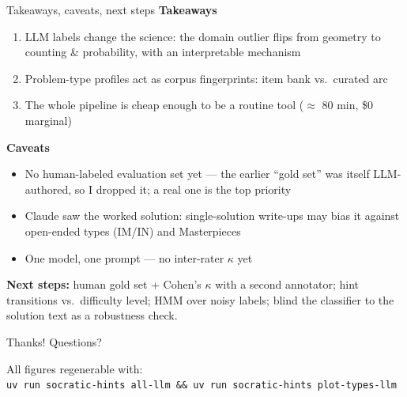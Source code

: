 \documentclass[10pt,aspectratio=169]{beamer}
\begin{document}
\begin{frame}{Takeaways, caveats, next steps}
  \textbf{Takeaways}
  \begin{enumerate}
    \item LLM labels change the science: the domain outlier flips from geometry to
          counting \& probability, with an interpretable mechanism
    \item Problem-type profiles act as corpus fingerprints: item bank vs.\ curated arc
    \item The whole pipeline is cheap enough to be a routine tool ($\approx$ 80 min, \$0 marginal)
  \end{enumerate}
  \medskip
  \textbf{Caveats}
  \begin{itemize}
    \item No human-labeled evaluation set yet --- the earlier ``gold set'' was itself
          LLM-authored, so I dropped it; a real one is the top priority
    \item Claude saw the worked solution: single-solution write-ups may bias it against
          open-ended types (IM/IN) and Masterpieces
    \item One model, one prompt --- no inter-rater $\kappa$ yet
  \end{itemize}
  \medskip
  \textbf{Next steps:} human gold set + Cohen's $\kappa$ with a second annotator;
  hint transitions vs.\ difficulty level; HMM over noisy labels; blind the classifier
  to the solution text as a robustness check.
\end{frame}

\begin{frame}
  \centering
  {\Large Thanks! Questions?}

  \bigskip
  \small
  All figures regenerable with: \\
  \texttt{uv run socratic-hints all-llm \&\& uv run socratic-hints plot-types-llm}
\end{frame}
\end{document}
